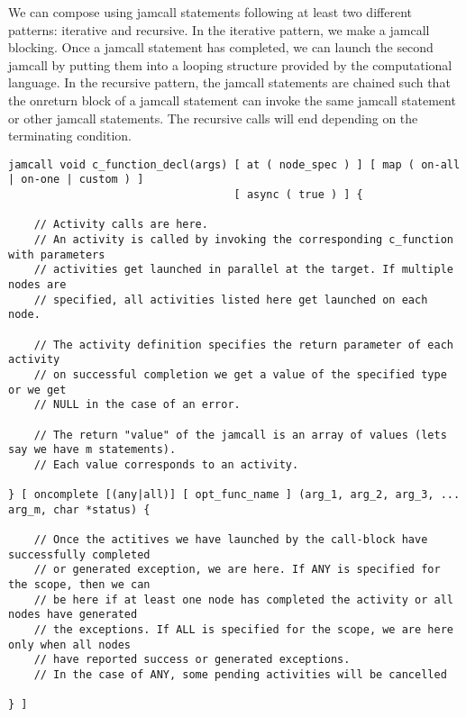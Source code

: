 \documentclass[11pt]{article}
\begin{document}
We can compose using jamcall statements following at least two different
patterns: iterative and recursive. In the iterative pattern, we make a jamcall
blocking. Once a jamcall statement has completed, we can launch the second
jamcall by putting them into a looping structure provided by the computational
language. In the recursive pattern, the jamcall statements are chained such that
the onreturn block of a jamcall statement can invoke the same jamcall statement
or other jamcall statements. The recursive calls will end depending on the
terminating condition.



\begin{lstlisting}[caption=Syntax of the activity control construct, label=jamcall_def]
jamcall void c_function_decl(args) [ at ( node_spec ) ] [ map ( on-all | on-one | custom ) ]
                                   [ async ( true ) ] {

    // Activity calls are here.
    // An activity is called by invoking the corresponding c_function with parameters
    // activities get launched in parallel at the target. If multiple nodes are
    // specified, all activities listed here get launched on each node.

    // The activity definition specifies the return parameter of each activity
    // on successful completion we get a value of the specified type or we get
    // NULL in the case of an error.

    // The return "value" of the jamcall is an array of values (lets say we have m statements).
    // Each value corresponds to an activity.

} [ oncomplete [(any|all)] [ opt_func_name ] (arg_1, arg_2, arg_3, ... arg_m, char *status) {

    // Once the actitives we have launched by the call-block have successfully completed
    // or generated exception, we are here. If ANY is specified for the scope, then we can
    // be here if at least one node has completed the activity or all nodes have generated
    // the exceptions. If ALL is specified for the scope, we are here only when all nodes
    // have reported success or generated exceptions.
    // In the case of ANY, some pending activities will be cancelled

} ]
\end{lstlisting}
\end{document}
